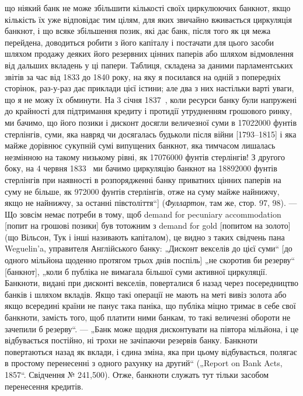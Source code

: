{що ніякий банк не може збільшити кількості своїх циркулюючих банкнот,
якщо кількість їх уже відповідає тим цілям, для яких звичайно вживається циркуляція
банкнот, і що всяке збільшення позик, які дає банк, після того як ця межа
перейдена, доводиться робити з його капіталу і постачати для цього засоби
шляхом продажу деяких його резервних цінних паперів або шляхом відмовлення
від дальших вкладень у ці папери. Таблиця, складена за даними парламентських
звітів за час від 1833 до 1840 року, на яку я посилався на одній з попередніх
сторінок, раз-у-раз дає приклади цієї істини; але два з них настільки варті уваги,
що я не можу їх обминути. На 3 січня 1837~, коли ресурси банку були
напружені до крайності для підтримання кредиту і протидії утрудненням
грошового ринку, ми бачимо, що його позики і дисконт досягли величезної
суми в 17022000 фунтів стерлінгів, суми, яка навряд чи досягалась будьколи
після війни [1793--1815] і яка майже дорівнює сукупній сумі випущених
банкнот, яка тимчасом лишалась незмінною на такому низькому рівні,
як 17076000 фунтів стерлінгів! З другого боку, на 4 червня 1833~ ми бачимо
циркуляцію банкнот на 18892000 фунтів стерлінгів при наявності в розпорядженні
банку приватних цінних паперів на суму не більше, як 972000 фунтів
стерлінгів, отже на суму майже найнижчу, якщо не найнижчу, за останні
півстоліття“] (\emph{Фуллартон}, там же, стор. 97, 98). — Що зовсім немає потреби
в тому, щоб demand for pecuniary accommodation [попит на грошові позики] був
тотожним з demand for gold [попитом на золото] (що Вільсон, Тук і інші називають
капіталом), це видно з таких свідчень пана Weguelin’a, управителя Англійського
банку: „Дисконт векселів до цієї суми“ [до одного мільйона щоденно
протягом трьох днів поспіль] „не скоротив би резерву“ [банкнот], „коли б публіка
не вимагала більшої суми активної циркуляції. Банкноти, видані при
дисконті векселів, поверталися б назад через посередництво банків і шляхом
вкладів. Якщо такі операції не мають на меті вивіз золота або якщо всередині
країни не панує така паніка, що публіка міцно тримає в себе свої банкноти,
замість того, щоб платити ними банкам, то такі величезні обороти не зачепили б
резерву“. — „Банк може щодня дисконтувати на півтора мільйона, і це відбувається
постійно, ні трохи не зачіпаючи резервів банку. Банкноти повертаються
назад як вклади, і єдина зміна, яка при цьому відбувається, полягає в простому
перенесенні з одного рахунку на другий“ („Report on Bank Acts, 1857“. Свідчення
№ 241,500). Отже, банкноти служать тут тільки засобом перенесення кредитів.
}

